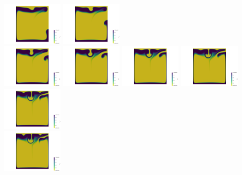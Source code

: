 \begin{itemize}
\begin{center}
\includegraphics[width=3cm]{images/benchmark_vaks97/aspect/lvl8/composition0008}
\includegraphics[width=3cm]{images/benchmark_vaks97/aspect/lvl8/composition0009}\\
\includegraphics[width=3cm]{images/benchmark_vaks97/aspect/lvl8/composition0010}
\includegraphics[width=3cm]{images/benchmark_vaks97/aspect/lvl8/composition0011}
\includegraphics[width=3cm]{images/benchmark_vaks97/aspect/lvl8/composition0012}
\includegraphics[width=3cm]{images/benchmark_vaks97/aspect/lvl8/composition0013}
\includegraphics[width=3cm]{images/benchmark_vaks97/aspect/lvl8/composition0014}\\
\includegraphics[width=3cm]{images/benchmark_vaks97/aspect/lvl8/composition0015}

\end{center}
\end{itemize}
